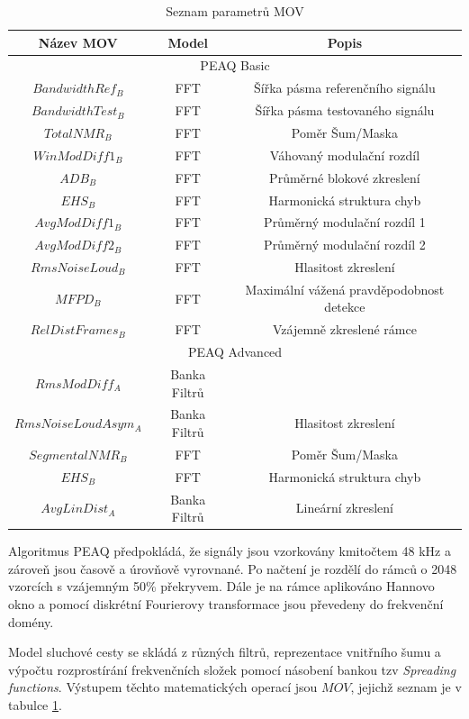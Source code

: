 \begin{table}[h]
\centering
\begin{tabular}{|c|c|c|}
\hline
Název MOV & Model & Popis \\ \hline
\multicolumn{3}{|c|}{PEAQ Basic} \\ \hline
$BandwidthRef_B$ & FFT & Šířka pásma referenčního signálu \\ \hline
$BandwidthTest_B$ & FFT & Šířka pásma testovaného signálu \\ \hline
$Total NMR_B$ & FFT & Poměr Šum/Maska \\ \hline
$WinModDiff1_B$ & FFT & Váhovaný modulační rozdíl \\ \hline
$ADB_B$ & FFT & Průměrné blokové zkreslení \\ \hline
$EHS_B$ & FFT & Harmonická struktura chyb \\ \hline
$AvgModDiff1_B$ & FFT & Průměrný modulační rozdíl 1 \\ \hline
$AvgModDiff2_B$ & FFT & Průměrný modulační rozdíl 2 \\ \hline
$RmsNoiseLoud_B$ & FFT & Hlasitost zkreslení \\ \hline
$MFPD_B$ & FFT & Maximální vážená pravděpodobnost detekce \\ \hline
$RelDistFrames_B$ & FFT & Vzájemně zkreslené rámce \\ \hline
\multicolumn{3}{|c|}{PEAQ Advanced} \\ \hline
$RmsModDiff_A$ & Banka Filtrů &  \\ \hline
$RmsNoiseLoudAsym_A$ & Banka Filtrů & Hlasitost zkreslení \\ \hline
$Segmental NMR_B$ & FFT & Poměr Šum/Maska \\ \hline
$EHS_B$ & FFT & Harmonická struktura chyb \\ \hline
$AvgLinDist_A$ & Banka Filtrů & Lineární zkreslení \\ \hline
\end{tabular}
\caption{Seznam parametrů MOV}
\label{table:movs}
\end{table}

Algoritmus PEAQ předpokládá, že signály jsou vzorkovány kmitočtem 48 kHz a zároveň jsou časově a úrovňově vyrovnané. Po načtení je rozdělí do rámců o 2048 vzorcích s vzájemným 50\% překryvem. Dále je na rámce aplikováno Hannovo okno a pomocí diskrétní Fourierovy transformace jsou převedeny do frekvenční domény.

Model sluchové cesty se skládá z různých filtrů, reprezentace vnitřního šumu a výpočtu rozprostírání frekvenčních složek pomocí násobení bankou tzv \textit{Spreading functions}. Výstupem těchto matematických operací jsou $MOV$, jejichž seznam je v tabulce \ref{table:movs}.

